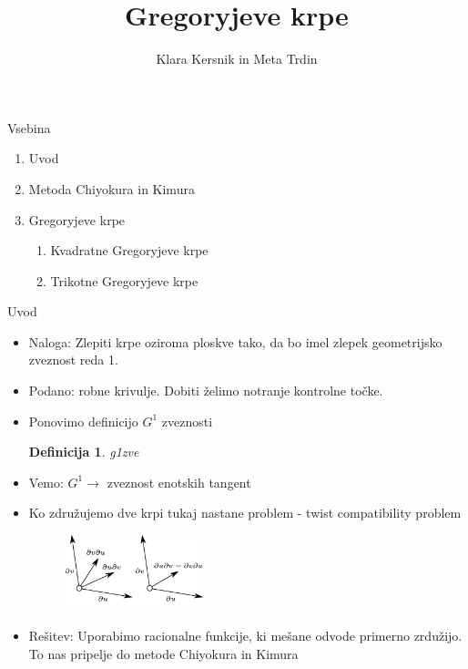 \documentclass[a4paper,8pt]{beamer}
\title{Gregoryjeve krpe}
\author{Klara Kersnik in Meta Trdin} %
\institute[FMF]{Fakulteta za matematiko in fiziko}
\date{}
\newtheorem{definicija}{Definicija}
\begin{document}
\begin{frame}
\maketitle
\end{frame}

\begin{frame}{Vsebina}

\fontsize{14pt}{7.2}\selectfont

\begin{enumerate}
	\item Uvod
	\item Metoda Chiyokura in Kimura
	\item Gregoryjeve krpe
	\begin{enumerate}
		\item Kvadratne Gregoryjeve krpe
		\item Trikotne Gregoryjeve krpe
	\end{enumerate}
\end{enumerate}

\end{frame}

\begin{frame}{Uvod}
\begin{itemize}
	\item Naloga: Zlepiti krpe oziroma ploskve tako, da bo imel zlepek geometrijsko zveznost reda 1. 	\item Podano: robne krivulje. Dobiti želimo notranje kontrolne točke.
	\item Ponovimo definicijo $G^1$ zveznosti
	\begin{definicija}
		g1zve
	\end{definicija}
	\item Vemo: $G^1 \rightarrow$ zveznost enotskih tangent
	\item Ko združujemo dve krpi tukaj nastane problem - twist compatibility problem
	\pause
	\begin{figure}[h]
		\centering
		\includegraphics[width=4cm]{mesani_odvodi_ob.jpg}
	\end{figure}
	
	\item Rešitev: Uporabimo racionalne funkcije, ki mešane odvode primerno zrdužijo. To nas pripelje do metode Chiyokura in Kimura

	
\end{itemize}

\end{frame}
\end{document}
